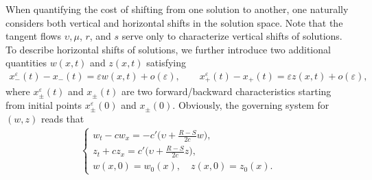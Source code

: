 \documentclass[11pt,reqno]{article}
\newcommand{\eps}{\varepsilon}
\newcommand{\dps}{\displaystyle}
\newcommand{\fr}{\frac}
\numberwithin{equation}{section}
\begin{document}
When quantifying the cost of shifting from one solution to another, one naturally considers both vertical and horizontal shifts in the solution space. Note that the tangent flows $\upsilon, \mu$, $r$, and $s$ serve only to characterize vertical shifts of solutions. To describe horizontal shifts of solutions, we further introduce two additional quantities \(w(x,t)\) and \(z(x,t)\) satisfying
\begin{align}\label{6.7}
x_{-}^\eps(t)-x_-(t)=\eps w(x,t)+o(\eps),\qquad x_{+}^\eps(t)-x_+(t)=\eps z(x,t)+o(\eps),
\end{align}
where $x_{\pm}^\eps(t)$ and $x_\pm(t)$ are two forward/backward characteristics starting from initial points $x_{\pm}^\eps(0)$ and $x_\pm(0)$. Obviously, the governing system for $(w,z)$ reads that
\begin{align}\label{6.8}
\left\{
\begin{array}{l}
\dps w_t-cw_x=-c'\Big(\upsilon+\fr{R-S}{2c}w\Big), \\[12pt]
\dps z_t+cz_x=c'\Big(\upsilon+\fr{R-S}{2c}z\Big), \\[8pt]
w(x,0)=w_0(x),\quad z(x,0)=z_0(x).
\end{array}
\right.
\end{align}
\end{document}
